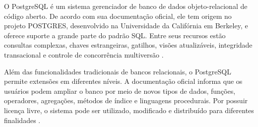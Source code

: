 O PostgreSQL é um sistema gerenciador de banco de dados objeto-relacional de código aberto. De acordo com sua documentação oficial, ele tem origem no projeto POSTGRES, desenvolvido na Universidade da Califórnia em Berkeley, e oferece suporte a grande parte do padrão SQL. Entre seus recursos estão consultas complexas, chaves estrangeiras, gatilhos, visões atualizáveis, integridade transacional e controle de concorrência multiversão \cite{postgresql_intro_2026}.

Além das funcionalidades tradicionais de bancos relacionais, o PostgreSQL permite extensões em diferentes níveis. A documentação oficial informa que os usuários podem ampliar o banco por meio de novos tipos de dados, funções, operadores, agregações, métodos de índice e linguagens procedurais. Por possuir licença livre, o sistema pode ser utilizado, modificado e distribuído para diferentes finalidades \cite{postgresql_intro_2026}.
